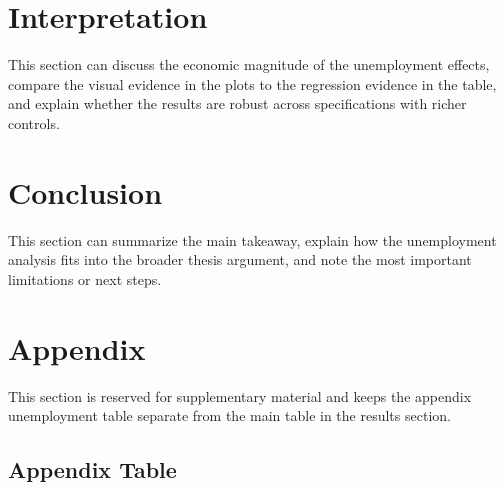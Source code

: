 \documentclass[12pt]{article}
\begin{document}
\clearpage
\section{Interpretation}

This section can discuss the economic magnitude of the unemployment effects, compare the visual evidence in the plots to the regression evidence in the table, and explain whether the results are robust across specifications with richer controls.

\section{Conclusion}

This section can summarize the main takeaway, explain how the unemployment analysis fits into the broader thesis argument, and note the most important limitations or next steps.

\clearpage
\appendix
\section{Appendix}

This section is reserved for supplementary material and keeps the appendix unemployment table separate from the main table in the results section.

\subsection{Appendix Table}

\begin{table}[htbp]
    \centering
    \caption{Appendix unemployment regression results}
    \label{tab:unemployment_appendix}
    \resizebox{0.9\textwidth}{!}{}
\end{table}
\end{document}
